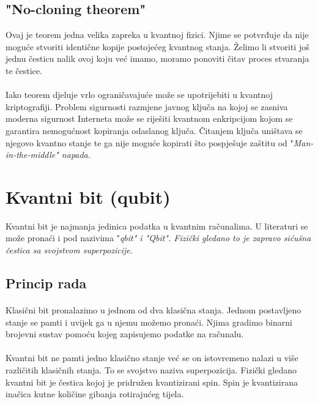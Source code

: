 \documentclass[times, utf8, zavrsni, numeric]{fer}
\begin{document}
\subsection{"No-cloning theorem"}
Ovaj je teorem jedna velika zapreka u kvantnoj fizici. 
Njime se potvrđuje da nije moguće stvoriti identične kopije postojećeg kvantnog stanja. Želimo li stvoriti još jednu česticu nalik ovoj koju već imamo, moramo ponoviti čitav proces stvaranja te čestice. \cite{q_history}

\paragraph{}
Iako teorem djeluje vrlo ograničavajuće može se upotrijebiti u kvantnoj kriptografiji. Problem sigurnosti razmjene javnog ključa na kojoj se zasniva moderna sigurnost Interneta može se riješiti kvantnom enkripcijom kojom se garantira nemogućnost kopiranja odaslanog ključa. Čitanjem ključa uništava se njegovo kvantno stanje te ga nije moguće kopirati što pospješuje zaštitu od "\it Man-in-the-middle\rm" napada. \citep{han_phd}

\section{Kvantni bit (qubit)}
Kvantni bit je najmanja jedinica podatka u kvantnim računalima. U literaturi se može pronaći i pod nazivima "\it qbit\rm" i "\it Qbit\rm". Fizički gledano to je zapravo sićušna čestica sa svojstvom superpozicije.

\subsection{Princip rada}
\paragraph{}
Klasični bit pronalazimo u jednom od dva klasična stanja. Jednom postavljeno stanje se pamti i uvijek ga u njemu možemo pronaći. Njima gradimo binarni brojevni sustav pomoću kojeg zapisujemo podatke na računalu.

\paragraph{}
Kvantni bit ne pamti jedno klasično stanje već se on istovremeno nalazi u više različitih klasičnih stanja. To se svojstvo naziva superpozicija. Fizički gledano kvantni bit je čestica kojoj je pridružen kvantizirani spin. Spin je kvantizirana inačica kutne količine gibanja rotirajućeg tijela.
\end{document}

